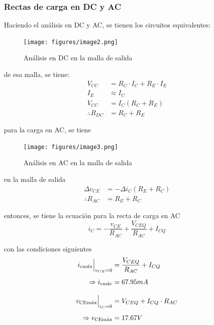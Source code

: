\documentclass[a4paper, 12pt]{article}
\begin{document}
\newpage
\subsubsection{Rectas de carga en DC y AC}
Haciendo el análisis en DC y AC, se tienen los circuitos equivalentes:

\begin{figure}[H]
    \centering
    \texttt{[image: figures/image2.png]}
    \caption{Análisis en DC en la malla de salida}
\end{figure}

de esa malla, se tiene:
\begin{align}
    V_{CC} &= R_C\cdot I_C + R_E\cdot I_E \\
    I_E &\approx I_C \nonumber\\
    V_{CC} &= I_C(R_C + R_E) \nonumber\\
    \therefore R_{DC} &= R_C + R_E \nonumber
\end{align}

para la carga en AC, se tiene
\begin{figure}[H]
    \centering
    \texttt{[image: figures/image3.png]}
    \caption{Análisis en AC en la malla de salida}
\end{figure}
en la malla de salida
\begin{align*}
    \Delta v_{CE} &= -\Delta i_C (R_E + R_C) \\
    \therefore R_{AC} &= R_E + R_C
\end{align*}

entonces, se tiene la ecuación para la recta de carga en AC
\begin{equation}
    i_C = -\dfrac{v_{CE}}{R_{AC}} + \dfrac{V_{CEQ}}{R_{AC}} + I_{CQ}
\end{equation}

con las condiciones siguientes
\begin{align*}
    \Bigl. i_{\text{cmáx}}\Bigr|_{v_{CE}=0} &= \dfrac{V_{CEQ}}{R_{AC}} + I_{CQ} \\[1.5mm]
    \Rightarrow i_{\text{cmác}} &= 67.95 mA \\[3mm]
    \Bigl. v_{\text{CEmáx}}\Bigr|_{i_C=0} &= V_{CEQ} + I_{CQ}\cdot R_{AC}\\[1.5mm]
    \Rightarrow v_{\text{CEmáx}} &= 17.67 V
\end{align*}
\end{document}
